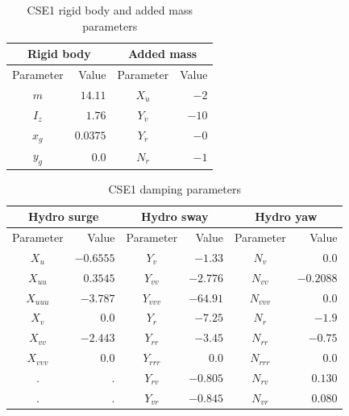 \begin{table}[h!]
	\begin{centering}
		\begin{tabular}{crcr}
			\multicolumn{2}{c}{Rigid body} & \multicolumn{2}{c}{Added mass}\tabularnewline
			\midrule 
			Parameter & Value & Parameter & Value\tabularnewline
			\midrule 
			$m$  & $14.11$  & $X_{\dot{u}}$  & $-2$ \tabularnewline
			$I_{z}$  & $1.76$  & $Y_{\dot{v}}$  & $-10$ \tabularnewline
			$x_{g}$  & $0.0375$  & $Y_{\dot{r}}$  & $-0$ \tabularnewline
			$y_{g}$  & $0.0$  & $N_{\dot{r}}$  & $-1$ \tabularnewline
			\bottomrule
		\end{tabular}
		\par\end{centering}
	\caption{CSE1 rigid body and added mass parameters}
	\label{tab: CSE1-rigid-body}
\end{table}

\begin{table}[h!]
	\begin{centering}
		\begin{tabular}{crcrcr}
			\multicolumn{2}{c}{Hydro surge} & \multicolumn{2}{c}{Hydro sway} & \multicolumn{2}{c}{Hydro yaw}\tabularnewline
			\midrule 
			{Parameter}  & {Value}  & {Parameter}  & {Value}  & {Parameter}  & {Value} \tabularnewline
			\midrule 
			$X_{u}$  & $-0.6555$  & $Y_{v}$  & $-1.33$  & $N_{v}$  & $0.0$ \tabularnewline
			$X_{uu}$  & $0.3545$  & $Y_{vv}$  & $-2.776$  & $N_{vv}$  & $-0.2088$ \tabularnewline
			$X_{uuu}$  & $-3.787$  & $Y_{vvv}$  & $-64.91$  & $N_{vvv}$  & $0.0$ \tabularnewline
			$X_{v}$  & $0.0$  & $Y_{r}$  & $-7.25$  & $N_{r}$  & $-1.9$ \tabularnewline
			$X_{vv}$  & $-2.443$  & $Y_{rr}$  & $-3.45$  & $N_{rr}$  & $-0.75$ \tabularnewline
			$X_{vvv}$  & $0.0$  & $Y_{rrr}$  & $0.0$  & $N_{rrr}$  & $0.0$ \tabularnewline
			$.$  & $.$  & $Y_{rv}$  & $-0.805$  & $N_{rv}$  & $0.130$ \tabularnewline
			$.$  & $.$  & $Y_{vr}$  & $-0.845$  & $N_{vr}$  & $0.080$ \tabularnewline
			\bottomrule
		\end{tabular}
		\par\end{centering}
	\caption{CSE1 damping parameters}
	\label{tab: CSE1 damping parameters 2}
\end{table}